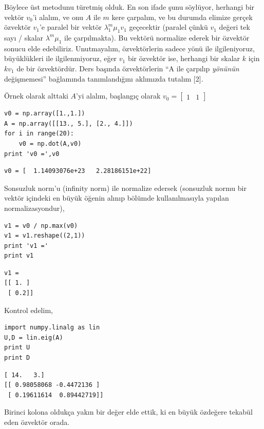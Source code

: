 \documentclass[12pt,fleqn]{article}\usepackage{../../common}
\begin{document}
Böylece üst metodunu türetmiş olduk. En son ifade şunu söylüyor, herhangi bir
vektör $v_0$'i alalım, ve onu $A$ ile $m$ kere çarpalım, ve bu durumda elimize
gerçek özvektör $v_1$'e paralel bir vektör $\lambda_1^m \mu_1v_1$ geçecektir
(paralel çünkü $v_1$ değeri tek sayı / skalar $\lambda^m\mu_1$ ile
çarpılmakta). Bu vektörü normalize ederek bir özvektör sonucu elde
edebiliriz. Unutmayalım, özvektörlerin sadece yönü ile ilgileniyoruz,
büyüklükleri ile ilgilenmiyoruz, eğer $v_1$ bir özvektör ise, herhangi bir
skalar $k$ için $kv_1$ de bir özvektördür. Ders başında özvektörlerin ``A ile
çarpılıp {\em yönünün} değişmemesi'' bağlamında tanımlandığını aklımızda tutalım
[2].

Örnek olarak alttaki $A$'yi alalım, başlangıç olarak
$v_0=\left[\begin{array}{cc} 1 & 1 \end{array}\right]$

\begin{verbatim}
v0 = np.array([1.,1.])
A = np.array([[13., 5.], [2., 4.]])
for i in range(20): 
    v0 = np.dot(A,v0)
print 'v0 =',v0
\end{verbatim}

\begin{verbatim}
v0 = [  1.14093076e+23   2.28186151e+22]
\end{verbatim}

Sonsuzluk norm'u (infinity norm) ile normalize edersek (sonsuzluk normu bir
vektör içindeki en büyük öğenin alınıp bölümde kullanılmasıyla yapılan
normalizasyondur),

\begin{verbatim}
v1 = v0 / np.max(v0)
v1 = v1.reshape((2,1))
print 'v1 ='
print v1
\end{verbatim}

\begin{verbatim}
v1 =
[[ 1. ]
 [ 0.2]]
\end{verbatim}

Kontrol edelim,

\begin{verbatim}
import numpy.linalg as lin
U,D = lin.eig(A)
print U
print D
\end{verbatim}

\begin{verbatim}
[ 14.   3.]
[[ 0.98058068 -0.4472136 ]
 [ 0.19611614  0.89442719]]
\end{verbatim}

Birinci kolona oldukça yakın bir değer elde ettik, ki en büyük özdeğere
tekabül eden özvektör orada.
\end{document}
